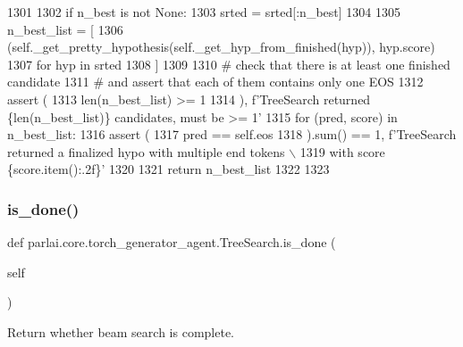 \begin{DoxyCode}
1301 
1302         \textcolor{keywordflow}{if} n\_best \textcolor{keywordflow}{is} \textcolor{keywordflow}{not} \textcolor{keywordtype}{None}:
1303             srted = srted[:n\_best]
1304 
1305         n\_best\_list = [
1306             (self.\_get\_pretty\_hypothesis(self.\_get\_hyp\_from\_finished(hyp)), hyp.score)
1307             \textcolor{keywordflow}{for} hyp \textcolor{keywordflow}{in} srted
1308         ]
1309 
1310         \textcolor{comment}{# check that there is at least one finished candidate}
1311         \textcolor{comment}{# and assert that each of them contains only one EOS}
1312         \textcolor{keyword}{assert} (
1313             len(n\_best\_list) >= 1
1314         ), f\textcolor{stringliteral}{'TreeSearch returned \{len(n\_best\_list)\} candidates, must be >= 1'}
1315         \textcolor{keywordflow}{for} (pred, score) \textcolor{keywordflow}{in} n\_best\_list:
1316             \textcolor{keyword}{assert} (
1317                 pred == self.eos
1318             ).sum() == 1, f\textcolor{stringliteral}{'TreeSearch returned a finalized hypo with multiple end tokens \(\backslash\)}
1319 \textcolor{stringliteral}{            with score \{score.item():.2f\}'}
1320 
1321         \textcolor{keywordflow}{return} n\_best\_list
1322 
1323 
\end{DoxyCode}
\mbox{\label{classparlai_1_1core_1_1torch__generator__agent_1_1TreeSearch_a35a3cbfe2df2d02bb46f7e492657afa5}} 
\subsubsection{\texorpdfstring{is\+\_\+done()}{is\_done()}}
{\footnotesize\ttfamily def parlai.\+core.\+torch\+\_\+generator\+\_\+agent.\+Tree\+Search.\+is\+\_\+done (\begin{DoxyParamCaption}\item[{}]{self }\end{DoxyParamCaption})}

\begin{DoxyVerb}Return whether beam search is complete.
\end{DoxyVerb}
 

